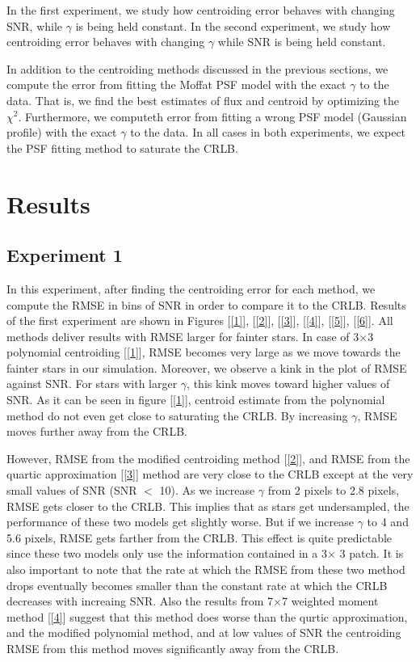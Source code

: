 \documentclass[12pt, preprint]{aastex}
\begin{document}
In the first experiment, we study how centroiding error behaves with changing
SNR, while $\gamma$ is being held constant. In the second experiment, we study 
how centroiding error behaves with changing $\gamma$ while SNR is being held constant.

In addition to the centroiding methods discussed in the previous sections,
we compute the error from fitting the Moffat PSF model with the exact $\gamma$ to
the data. That is, we find the best estimates of flux and centroid by
optimizing the $\chi^{2}$. Furthermore, we computeth error from fitting a
wrong PSF model (Gaussian profile) with the exact $\gamma$ to the data.
In all cases in both experiments, we expect the PSF fitting method to saturate 
the CRLB. 

\section{Results}\label{sec:results}

\subsection{Experiment 1}
   
In this experiment, after finding the centroiding error for each method,
we compute the RMSE in bins of SNR in order to compare it to the CRLB. 
Results of the first experiment are shown in Figures [\ref{1}], [\ref{2}],
[\ref{3}], [\ref{4}], [\ref{5}], [\ref{6}]. All methods deliver results
with RMSE larger for fainter stars.
In case of 3$\times$3 polynomial centroiding [\ref{1}], RMSE becomes
very large as we move towards the fainter stars in our simulation.
Moreover, we observe a kink in the plot of RMSE against SNR.
For stars with larger $\gamma$, this kink moves toward higher values of SNR.
As it can be seen in figure [\ref{1}], centroid estimate from the polynomial
method do not even get close to saturating the CRLB. By increasing $\gamma$,
RMSE moves further away from the CRLB.

However, RMSE from the modified centroiding method [\ref{2}],
and RMSE from the quartic approximation [\ref{3}] method are very
close to the CRLB except at the very small values of SNR (SNR $<$ 10).
As we increase $\gamma$ from 2 pixels to 2.8 pixels, RMSE gets closer
to the CRLB. This implies that as stars get undersampled, the performance
of these two models get slightly worse. But if we increase $\gamma$ to
4 and 5.6 pixels, RMSE gets farther from the CRLB.
This effect is quite predictable since these two models only use the
information contained in a 3$\times$ 3 patch. It is also important to
note that the rate at which the RMSE from these two method drops
eventually becomes smaller than the constant rate at which the CRLB
decreases with increaing SNR. Also the results from 7$\times$7 weighted moment
method [\ref{4}] suggest that this method does worse than the qurtic approximation, and
the modified polynomial method, and at low values of SNR the centroiding RMSE from
this method moves significantly away from the CRLB.
\end{document}
